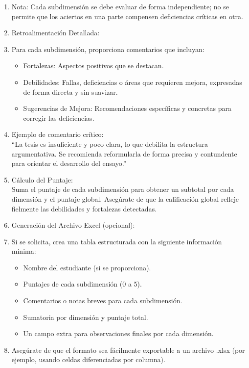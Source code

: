 \documentclass[spanish]{textolivre}
\begin{document}
\begin{enumerate}[label=\arabic*., 
    leftmargin=*,
    widest=99
]
\begin{itemize}
        \item 4: Satisfactorio (se desarrolla adecuadamente, aunque presenta algunas áreas de mejora).
        \item 5: Destacado (cumple ampliamente con el criterio, sin apenas debilidades).
\end{itemize}
\item Nota: Cada subdimensión se debe evaluar de forma independiente; no se permite que los aciertos en una parte compensen deficiencias críticas en otra.
\item Retroalimentación Detallada:
\item[] Para cada subdimensión, proporciona comentarios que incluyan:
\begin{itemize}
    \item Fortalezas: Aspectos positivos que se destacan.
    \item Debilidades: Fallas, deficiencias o áreas que requieren mejora, expresadas de forma directa y sin suavizar.
    \item Sugerencias de Mejora: Recomendaciones específicas y concretas para corregir las deficiencias.
\end{itemize}
\item Ejemplo de comentario crítico: \\
``La tesis es insuficiente y poco clara, lo que debilita la estructura argumentativa. Se recomienda reformularla de forma precisa y contundente para orientar el desarrollo del ensayo.''
\item Cálculo del Puntaje: \\
Suma el puntaje de cada subdimensión para obtener un subtotal por cada dimensión y el puntaje global. Asegúrate de que la calificación global refleje fielmente las debilidades y fortalezas detectadas.
\item Generación del Archivo Excel (opcional):
\item[] Si se solicita, crea una tabla estructurada con la siguiente información mínima: 
\begin{itemize}
    \item Nombre del estudiante (si se proporciona).
    \item Puntajes de cada subdimensión (0 a 5).
    \item Comentarios o notas breves para cada subdimensión.
    \item Sumatoria por dimensión y puntaje total.
    \item Un campo extra para observaciones finales por cada dimensión.
\end{itemize}
\item Asegúrate de que el formato sea fácilmente exportable a un archivo .xlsx (por ejemplo, usando celdas diferenciadas por columna).
\end{enumerate}
\end{document}
